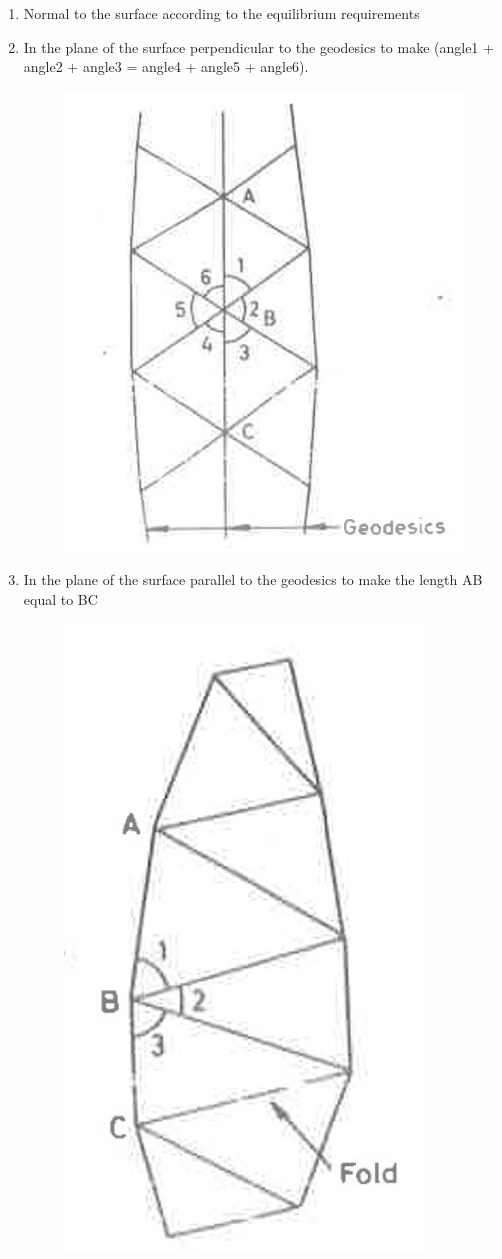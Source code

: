\begin{enumerate}
\item Normal to the surface according to the equilibrium requirements

\item In the plane of the surface perpendicular to the geodesics to make (angle1 + angle2 + angle3 = angle4 + angle5 + angle6).
\begin{figure}[H]
\centering
\includegraphics[height = 0.4\linewidth ]{figure/Method/method2A.JPG}
\caption{}
\end{figure}
\item In the plane of the surface parallel to the geodesics to make the length AB equal to BC
\begin{figure}[H]
\centering
\includegraphics[height = 0.4\linewidth ]{figure/Method/method2B.JPG}
\caption{}
\end{figure}
\end{enumerate}